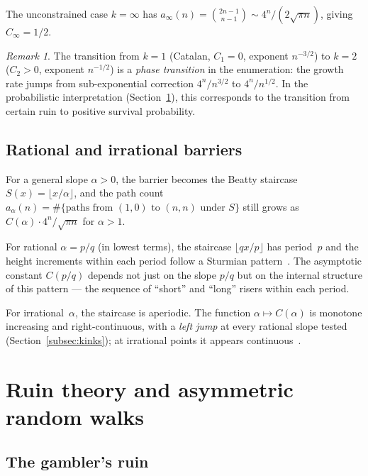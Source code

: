 \documentclass[11pt]{article}
\theoremstyle{definition}
\theoremstyle{remark}
\newtheorem{remark}[theorem]{Remark}
\newcommand{\floor}[1]{\lfloor #1 \rfloor}
\begin{document}
The unconstrained case $k = \infty$ has $a_\infty(n) = \binom{2n-1}{n-1}
\sim 4^n / (2\sqrt{\pi n})$, giving $C_\infty = 1/2$.

\begin{remark}
The transition from $k = 1$ (Catalan, $C_1 = 0$, exponent $n^{-3/2}$)
to $k = 2$ ($C_2 > 0$, exponent $n^{-1/2}$) is a \emph{phase transition}
in the enumeration: the growth rate jumps from sub-exponential correction
$4^n/n^{3/2}$ to $4^n/n^{1/2}$.
In the probabilistic interpretation (Section~\ref{sec:ruin}), this
corresponds to the transition from certain ruin to positive survival
probability.
\end{remark}

\subsection{Rational and irrational barriers}

For a general slope $\alpha > 0$, the barrier becomes the Beatty staircase
$S(x) = \floor{x/\alpha}$, and the path count
$a_\alpha(n) = \#\{\text{paths from $(1,0)$ to $(n,n)$ under } S\}$
still grows as $C(\alpha) \cdot 4^n / \sqrt{\pi n}$ for $\alpha > 1$.

For rational $\alpha = p/q$ (in lowest terms), the staircase $\floor{qx/p}$
has period~$p$ and the height increments within each period follow a
Sturmian pattern~\cite{Lothaire2002}.
The asymptotic constant $C(p/q)$ depends not just on the slope $p/q$ but
on the internal structure of this pattern --- the sequence of
``short'' and ``long'' risers within each period.

For irrational~$\alpha$, the staircase is aperiodic.
The function $\alpha \mapsto C(\alpha)$ is monotone increasing and
right-continuous, with a \emph{left jump} at every rational slope
tested (Section~\ref{subsec:kinks}); at irrational points it appears
continuous~\cite{PopelkaBeattyBallot2026}.

\section{Ruin theory and asymmetric random walks}\label{sec:ruin}

\subsection{The gambler's ruin}
\end{document}
